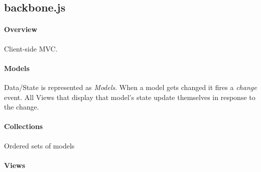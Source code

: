 \documentclass[11pt]{article} %
\begin{document}
\subsection{backbone.js}

\paragraph{Overview} Client-side MVC.

\paragraph{Models} Data/State is represented as \emph{Models}. When a model gets changed it fires a \emph{change}
event. All Views that display that model's state update themselves in response to the change.

\paragraph{Collections} Ordered sets of models

\paragraph{Views}
\end{document}
